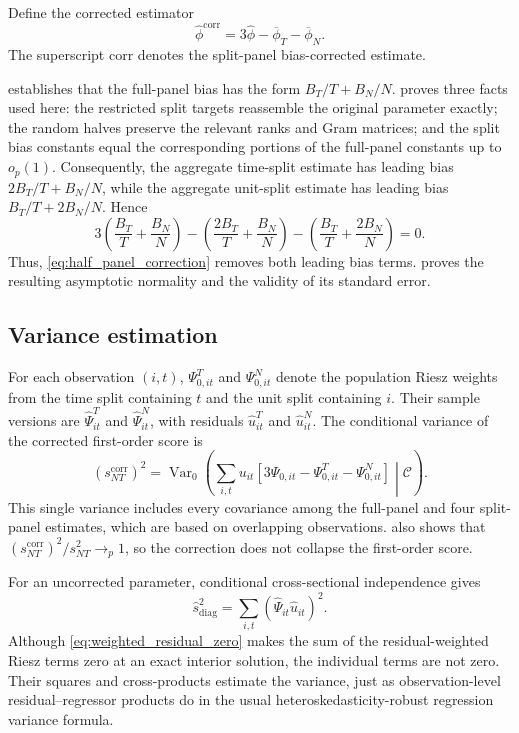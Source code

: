 \documentclass[11pt]{article}
\numberwithin{equation}{section}
\theoremstyle{remark}
\begin{document}
Define the corrected estimator
\begin{equation}
\label{eq:half_panel_correction}
\widehat\phi^{\mathrm{corr}}
=
3\widehat\phi-\overline\phi_T-\overline\phi_N.
\end{equation}
The superscript $\mathrm{corr}$ denotes the split-panel bias-corrected estimate.

 establishes that the full-panel bias has the form $B_T/T+B_N/N$.  proves three facts used here: the restricted split targets reassemble the original parameter exactly; the random halves preserve the relevant ranks and Gram matrices; and the split bias constants equal the corresponding portions of the full-panel constants up to $o_p(1)$. Consequently, the aggregate time-split estimate has leading bias $2B_T/T+B_N/N$, while the aggregate unit-split estimate has leading bias $B_T/T+2B_N/N$. Hence
$$
3\left(\frac{B_T}{T}+\frac{B_N}{N}\right)
-
\left(\frac{2B_T}{T}+\frac{B_N}{N}\right)
-
\left(\frac{B_T}{T}+\frac{2B_N}{N}\right)
=0.
$$
Thus, \eqref{eq:half_panel_correction} removes both leading bias terms.  proves the resulting asymptotic normality and the validity of its standard error.

\subsection{Variance estimation}
\label{subsec:variance}

For each observation $(i,t)$, $\Psi_{0,it}^{T}$ and $\Psi_{0,it}^{N}$ denote the population Riesz weights from the time split containing $t$ and the unit split containing $i$. Their sample versions are $\widehat\Psi_{it}^{T}$ and $\widehat\Psi_{it}^{N}$, with residuals $\widehat u_{it}^{T}$ and $\widehat u_{it}^{N}$. The conditional variance of the corrected first-order score is
\begin{equation}
\label{eq:corrected_population_variance}
(s_{NT}^{\mathrm{corr}})^2
=
\operatorname{Var}_0\!\left(
\sum_{i,t}u_{it}
\left[
3\Psi_{0,it}
-\Psi_{0,it}^{T}
-\Psi_{0,it}^{N}
\right]
\middle|\mathscr C
\right).
\end{equation}
This single variance includes every covariance among the full-panel and four split-panel estimates, which are based on overlapping observations.  also shows that $(s_{NT}^{\mathrm{corr}})^2/s_{NT}^2\to_p1$, so the correction does not collapse the first-order score.

For an uncorrected parameter, conditional cross-sectional independence gives
$$
\widehat s_{\mathrm{diag}}^2
=
\sum_{i,t}
(\widehat\Psi_{it}\widehat u_{it})^2.
$$
Although \eqref{eq:weighted_residual_zero} makes the sum of the residual-weighted Riesz terms zero at an exact interior solution, the individual terms are not zero. Their squares and cross-products estimate the variance, just as observation-level residual--regressor products do in the usual heteroskedasticity-robust regression variance formula.
\end{document}
